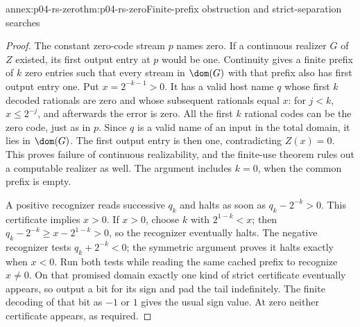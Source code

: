 \begin{annexitem}{annex:p04-rs-zero}{thm:p04-rs-zero}{Finite-prefix obstruction and strict-separation searches}
\begin{proof}
The constant zero-code stream \(p\) names zero.
If a continuous realizer \(G\) of \(Z\) existed, its first
output entry at \(p\) would be one.
Continuity gives a finite prefix of \(k\) zero entries such
that every stream in \(\dom(G)\) with that prefix also has
first output entry one.
Put \(x=2^{-k-1}>0\).
It has a valid host name \(q\) whose first \(k\) decoded
rationals are zero and whose subsequent rationals equal
\(x\): for \(j<k\), \(x\leq2^{-j}\), and afterwards the
error is zero. All the first \(k\) rational codes can
be the zero code, just as in \(p\).
Since \(q\) is a valid name of an input in the total domain,
it lies in \(\dom(G)\). The first output entry is then one,
contradicting \(Z(x)=0\).
This proves failure of continuous realizability, and the
finite-use theorem rules out a computable realizer as well.
The argument includes \(k=0\), when the common prefix is empty.

A positive recognizer reads successive \(q_k\) and halts
as soon as \(q_k-2^{-k}>0\).
This certificate implies \(x>0\).
If \(x>0\), choose \(k\) with \(2^{1-k}<x\);
then \(q_k-2^{-k}\geq x-2^{1-k}>0\), so the recognizer
eventually halts.
The negative recognizer tests \(q_k+2^{-k}<0\);
the symmetric argument proves it halts exactly when \(x<0\).
Run both tests while reading the same cached prefix to
recognize \(x\ne0\).
On that promised domain exactly one kind of strict
certificate eventually appears, so output a bit for its
sign and pad the tail indefinitely. The finite decoding
of that bit as \(-1\) or \(1\) gives the usual sign value.
At zero neither certificate appears, as required.
\end{proof}
\end{annexitem}


